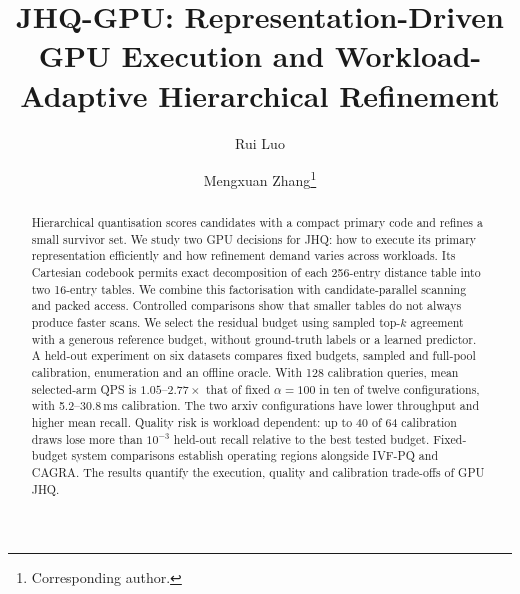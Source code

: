 \documentclass[runningheads]{llncs}
\begin{document}
\title{JHQ-GPU: Representation-Driven GPU Execution and
       Workload-Adaptive Hierarchical Refinement}
\author{Rui Luo \and Mengxuan Zhang\thanks{Corresponding author.}}
\maketitle
\begin{abstract}
Hierarchical quantisation scores candidates with a compact primary code and
refines a small survivor set. We study two GPU decisions for JHQ: how to
execute its primary representation efficiently and how refinement demand
varies across workloads.
Its Cartesian codebook permits exact decomposition of each 256-entry distance
table into two 16-entry tables. We combine this factorisation with
candidate-parallel scanning and packed access. Controlled comparisons show
that smaller tables do not always produce faster scans. We select the residual
budget using sampled top-$k$ agreement with a generous reference budget,
without ground-truth labels or a learned predictor. A held-out experiment on
six datasets compares fixed budgets, sampled and full-pool calibration,
enumeration and an offline oracle. With 128 calibration queries, mean
selected-arm QPS is $1.05$--$2.77\times$ that of fixed $\alpha=100$ in ten of
twelve configurations, with 5.2--30.8\,ms calibration. The two arxiv configurations
have lower throughput and higher mean recall. Quality risk is workload
dependent: up to 40 of 64 calibration draws lose more than $10^{-3}$ held-out
recall relative to the best tested budget. Fixed-budget system comparisons
establish operating regions alongside
IVF-PQ and CAGRA. The results quantify the execution, quality and calibration
trade-offs of GPU JHQ.
\end{abstract}







\end{document}
